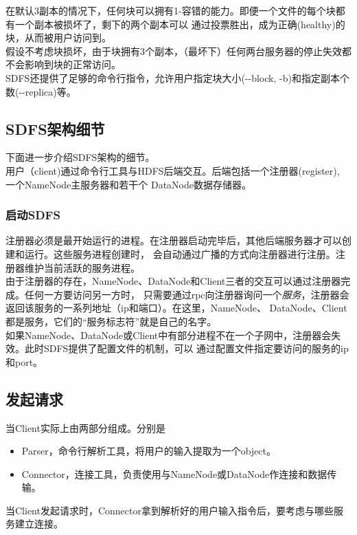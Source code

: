 \documentclass[a4paper]{article}
\begin{document}
在默认3副本的情况下，任何块可以拥有1-容错的能力。即便一个文件的每个块都有一个副本被损坏了，剩下的两个副本可以
通过投票胜出，成为正确(healthy)的块，从而被用户访问到。\\

假设不考虑块损坏，由于块拥有3个副本，（最坏下）任何两台服务器的停止失效都不会影响到块的正常访问。\\

SDFS还提供了足够的命令行指令，允许用户指定块大小(-{}-block, -b)和指定副本个数(-{}-replica)等。

\subsection{SDFS架构细节}
下面进一步介绍SDFS架构的细节。\\

用户（client)通过命令行工具与HDFS后端交互。后端包括一个注册器(register), 一个NameNode主服务器和若干个
DataNode数据存储器。\\

\subsubsection{启动SDFS}
注册器必须是最开始运行的进程。在注册器启动完毕后，其他后端服务器才可以创建和运行。这些服务进程创建时，
会自动通过广播的方式向注册器进行注册。注册器维护当前活跃的服务进程。\\

由于注册器的存在，NameNode、DataNode和Client三者的交互可以通过注册器完成。任何一方要访问另一方时，
只需要通过rpc向注册器询问一个\emph{服务}，注册器会返回该服务的一系列地址（ip和端口）。在这里，NameNode、
DataNode、Client都是服务，它们的``服务标志符''就是自己的名字。\\

如果NameNode、DataNode或Client中有部分进程不在一个子网中，注册器会失效。此时SDFS提供了配置文件的机制，可以
通过配置文件指定要访问的服务的ip和port。
\subsection{发起请求}
当Client实际上由两部分组成。分别是
\begin{itemize}
    \item Parser，命令行解析工具，将用户的输入提取为一个object。
    \item Connector，连接工具，负责使用与NameNode或DataNode作连接和数据传输。
\end{itemize}
当Client发起请求时，Connector拿到解析好的用户输入指令后，要考虑与哪些服务建立连接。\\
\end{document}
